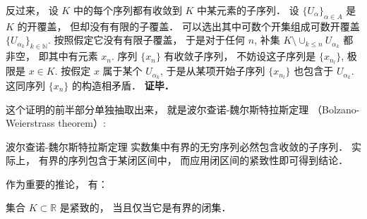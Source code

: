 反过来， 设 $K$ 中的每个序列都有收敛到 $K$ 中某元素的子序列． 设 $\{U_\alpha\}_{\alpha\in A}$ 是 $K$ 的开覆盖， 但却没有有限的子覆盖． 可以选出其中可数个开集组成可数开覆盖 $\{U_{\alpha_k}\}_{k\in\mathbb{N}}$. 按照假定它没有有限子覆盖， 于是对于任何 $n$, 补集 $K\setminus\cup_{k\leq n}U_{\alpha_k}$ 都非空， 即其中有元素 $x_n$. 序列 $\{x_n\}$ 有收敛子序列， 不妨设这子序列是 $\{x_{n_l}\}$, 极限是 $x\in K$. 按假定 $x$ 属于某个 $U_{\alpha_k}$, 于是从某项开始子序列 $\{x_{n_l}\}$ 也包含于 $U_{\alpha_k}$. 这同序列 $\{x_n\}$ 的构造相矛盾． \textbf{证毕．}

这个证明的前半部分单独抽取出来， 就是波尔查诺-魏尔斯特拉斯定理 （Bolzano-Weierstrass theorem）:
\begin{theorem}{波尔查诺-魏尔斯特拉斯定理}
实数集中有界的无穷序列必然包含收敛的子序列． 实际上， 有界的序列包含于某闭区间中， 而应用闭区间的紧致性即可得到结论．
\end{theorem}

作为重要的推论， 有：
\begin{theorem}{}
集合 $K\subset\mathbb{R}$ 是紧致的， 当且仅当它是有界的闭集．
\end{theorem}
